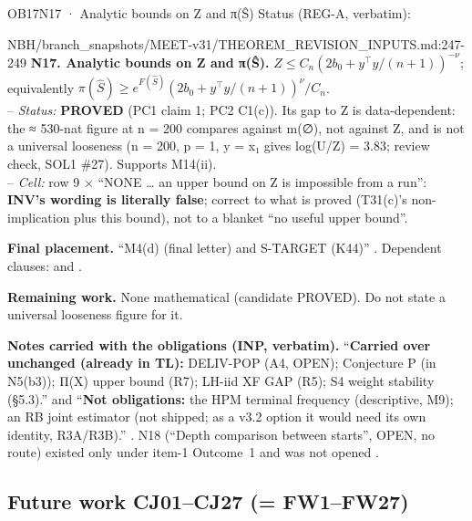 \begin{card}{OB17}{N17 · Analytic bounds on Z and π(Ŝ)}
Status (REG-A, verbatim):  
\begin{stmt}{NBH/branch_snapshots/MEET-v31/THEOREM_REVISION_INPUTS.md:247-249}
\textbf{N17. Analytic bounds on Z and π(Ŝ).} $Z ≤ C_n(2b_0 + y^{\top}y/(n+1))^{−ν}$; equivalently $π(\hat{S}) ≥ e^{F(\hat{S})}(2b_0 + y^{\top}y/(n+1))^{ν}/C_n$.\\
– \emph{Status:} \textbf{PROVED} (PC1 claim 1; PC2 C1(c)). Its gap to Z is data-dependent: the ≈ 530-nat figure at n = 200 compares against m(∅), not against Z, and is not a universal looseness (n = 200, p = 1, y = x₁ gives log(U/Z) = 3.83; review check, SOL1 \#27). Supports M14(ii).\\
– \emph{Cell:} row 9 × ``NONE … an upper bound on Z is impossible from a run'': \textbf{INV's wording is literally false}; correct to what is proved (T31(c)'s non-implication plus this bound), not to a blanket ``no useful upper bound''.
\end{stmt}
\textbf{Final placement.} ``M4(d) (final letter) and S-TARGET (K44)'' . Dependent clauses:  and .

\textbf{Remaining work.} None mathematical (candidate PROVED). Do not state a universal looseness figure for it.
\end{card}

\textbf{Notes carried with the obligations (INP, verbatim).} ``\textbf{Carried over unchanged (already in TL):} DELIV-POP (A4, OPEN); Conjecture P (in N5(b3)); Π(X) upper bound (R7); LH-iid XF GAP (R5); S4 weight stability (§5.3).'' and ``\textbf{Not obligations:} the HPM terminal frequency (descriptive, M9); an RB joint estimator (not shipped; as a v3.2 option it would need its own identity, R3A/R3B).'' . N18 (``Depth comparison between starts'', OPEN, no route) existed only under item-1 Outcome~1 and was not opened .

\subsection{Future work CJ01--CJ27 (= FW1--FW27)}\label{sec:future}

